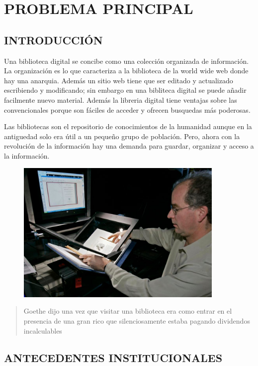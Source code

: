 \chapter*{PROBLEMA PRINCIPAL}

\section*{INTRODUCCIÓN}
Una biblioteca digital se concibe como una colección organizada de información. La organización es lo que caracteriza a la biblioteca de la world wide web donde hay una anarquia. Además un sitio web tiene que ser editado y actualizado escribiendo y modificando; sin embargo en una bibliteca digital se puede añadir facilmente nuevo material. Además la libreria digital tiene ventajas sobre las convencionales porque son fáciles de acceder y ofrecen busquedas más poderosas.

Las bibliotecas son el repositorio de conocimientos de la humanidad aunque en la antiguedad solo era útil a un pequeño grupo de población. Pero, ahora con la revolución de la información hay una demanda para guardar, organizar y acceso a la información. 

\begin{figure}[ht]
\centering
\includegraphics[width=10cm]{images/scaneandoLibro.jpg}
\end{figure} 

\begin{quote}
Goethe dijo una vez que visitar una biblioteca era como entrar en el presencia de una gran rico que silenciosamente estaba pagando dividendos incalculables
\end{quote}
\section*{ANTECEDENTES INSTITUCIONALES}
